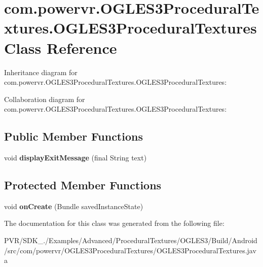 \hypertarget{classcom_1_1powervr_1_1_o_g_l_e_s3_procedural_textures_1_1_o_g_l_e_s3_procedural_textures}{\section{com.\+powervr.\+O\+G\+L\+E\+S3\+Procedural\+Textures.\+O\+G\+L\+E\+S3\+Procedural\+Textures Class Reference}
\label{classcom_1_1powervr_1_1_o_g_l_e_s3_procedural_textures_1_1_o_g_l_e_s3_procedural_textures}
}


Inheritance diagram for com.\+powervr.\+O\+G\+L\+E\+S3\+Procedural\+Textures.\+O\+G\+L\+E\+S3\+Procedural\+Textures\+:


Collaboration diagram for com.\+powervr.\+O\+G\+L\+E\+S3\+Procedural\+Textures.\+O\+G\+L\+E\+S3\+Procedural\+Textures\+:
\subsection*{Public Member Functions}
\begin{DoxyCompactItemize}
\item 
\hypertarget{classcom_1_1powervr_1_1_o_g_l_e_s3_procedural_textures_1_1_o_g_l_e_s3_procedural_textures_a2f7b73a0eec90d2745940abedcca935c}{void {\bfseries display\+Exit\+Message} (final String text)}\label{classcom_1_1powervr_1_1_o_g_l_e_s3_procedural_textures_1_1_o_g_l_e_s3_procedural_textures_a2f7b73a0eec90d2745940abedcca935c}

\end{DoxyCompactItemize}
\subsection*{Protected Member Functions}
\begin{DoxyCompactItemize}
\item 
\hypertarget{classcom_1_1powervr_1_1_o_g_l_e_s3_procedural_textures_1_1_o_g_l_e_s3_procedural_textures_a75be3c580e8586929af884dfaf184d8a}{void {\bfseries on\+Create} (Bundle saved\+Instance\+State)}\label{classcom_1_1powervr_1_1_o_g_l_e_s3_procedural_textures_1_1_o_g_l_e_s3_procedural_textures_a75be3c580e8586929af884dfaf184d8a}

\end{DoxyCompactItemize}


The documentation for this class was generated from the following file\+:\begin{DoxyCompactItemize}
\item 
P\+V\+R/\+S\+D\+K\+\_./\+Examples/\+Advanced/\+Procedural\+Textures/\+O\+G\+L\+E\+S3/\+Build/\+Android/src/com/powervr/\+O\+G\+L\+E\+S3\+Procedural\+Textures/O\+G\+L\+E\+S3\+Procedural\+Textures.\+java\end{DoxyCompactItemize}
